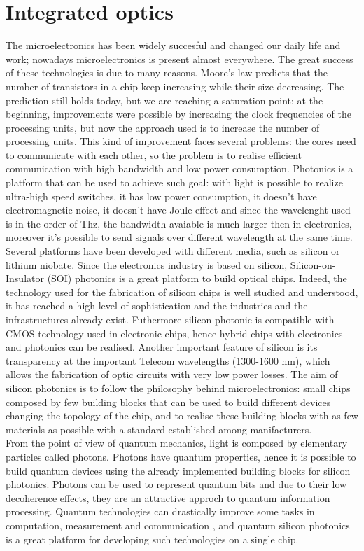 \section{Integrated optics}
The microelectronics has been widely succesful and changed our daily life and work; nowadays microelectronics is present almost everywhere. The great success of these technologies is due to many reasons. Moore's law predicts that the number of transistors in a chip keep increasing while their size decreasing. The prediction still holds today, but we are reaching a saturation point: at the beginning, improvements were possible by increasing the clock frequencies of the processing units, but now the approach used is to increase the number of processing units. This kind of improvement faces several problems: the cores need to communicate with each other, so the problem is to realise efficient communication with high bandwidth and low power consumption. Photonics is a platform that can be used to achieve such goal: with light is possible to realize ultra-high speed switches, it has low power consumption, it doesn't have electromagnetic noise, it doesn't have Joule effect and since the wavelenght used is in the order of Thz, the bandwidth avaiable is much larger then in electronics, moreover it's possible to send signals over different wavelength at the same time. Several platforms have been developed with different media, such as silicon or lithium niobate. Since the electronics industry is based on silicon, Silicon-on-Insulator (SOI) photonics is a great platform to build optical chips. Indeed, the technology used for the fabrication of silicon chips is well studied and understood, it has reached a high level of sophistication and the industries and the infrastructures already exist. Futhermore silicon photonic is compatible with CMOS technology used in electronic chips, hence hybrid chips with electronics and photonics can be realised. Another important feature of silicon is its transparency at the important Telecom wavelengths (1300-1600 nm), which allows the fabrication of optic circuits with very low power losses. The aim of silicon photonics is to follow the philosophy behind microelectronics: small chips composed by few building blocks that can be used to build different devices changing the topology of the chip, and to realise these building blocks with as few materials as possible with a standard established among manifacturers.\\
From the point of view of quantum mechanics, light is composed by elementary particles called photons. Photons have quantum properties, hence it is possible to build quantum devices using the already implemented building blocks for silicon photonics. Photons can be used to represent quantum bits and due to their low decoherence effects, they are an attractive approch to quantum information processing. Quantum technologies can drastically improve some tasks in computation, measurement and communication , and quantum silicon photonics is a great platform for developing such technologies on a single chip. 


